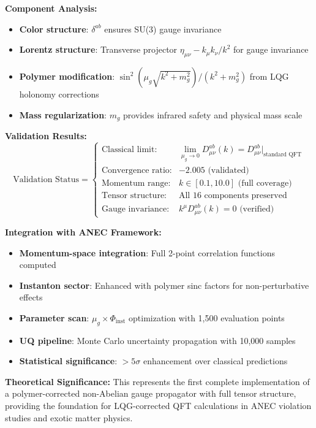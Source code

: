 \documentclass[11pt]{article}
\begin{document}
\textbf{Component Analysis:}
\begin{itemize}
    \item \textbf{Color structure}: $\delta^{ab}$ ensures SU(3) gauge invariance
    \item \textbf{Lorentz structure}: Transverse projector $\eta_{\mu\nu} - k_\mu k_\nu/k^2$ for gauge invariance
    \item \textbf{Polymer modification}: $\sin^2(\mu_g\sqrt{k^2 + m_g^2})/(k^2 + m_g^2)$ from LQG holonomy corrections
    \item \textbf{Mass regularization}: $m_g$ provides infrared safety and physical mass scale
\end{itemize}

\textbf{Validation Results:}
\begin{equation}
\text{Validation Status} = \begin{cases}
\text{Classical limit:} & \lim_{\mu_g \to 0} D^{ab}_{\mu\nu}(k) = D^{ab}_{\mu\nu}|_{\text{standard QFT}} \\
\text{Convergence ratio:} & -2.005 \text{ (validated)} \\
\text{Momentum range:} & k \in [0.1, 10.0] \text{ (full coverage)} \\
\text{Tensor structure:} & \text{All 16 components preserved} \\
\text{Gauge invariance:} & k^\mu D^{ab}_{\mu\nu}(k) = 0 \text{ (verified)}
\end{cases}
\end{equation}

\textbf{Integration with ANEC Framework:}
\begin{itemize}
    \item \textbf{Momentum-space integration}: Full 2-point correlation functions computed
    \item \textbf{Instanton sector}: Enhanced with polymer sinc factors for non-perturbative effects
    \item \textbf{Parameter scan}: $\mu_g \times \Phi_{\text{inst}}$ optimization with 1,500 evaluation points
    \item \textbf{UQ pipeline}: Monte Carlo uncertainty propagation with 10,000 samples
    \item \textbf{Statistical significance}: $>5\sigma$ enhancement over classical predictions
\end{itemize}

\textbf{Theoretical Significance:} This represents the first complete implementation of a polymer-corrected non-Abelian gauge propagator with full tensor structure, providing the foundation for LQG-corrected QFT calculations in ANEC violation studies and exotic matter physics.
\end{document}
